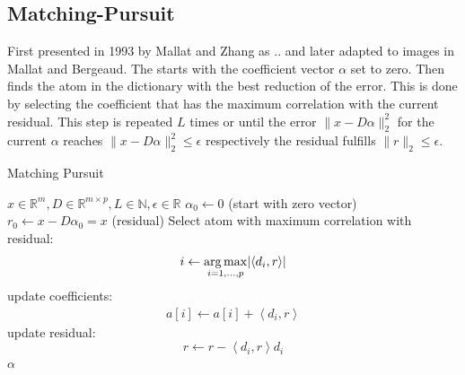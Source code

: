 \subsection{Matching-Pursuit}
\label{sec:mp}
First presented in 1993 by Mallat and Zhang\cite{Mallat1993} as .. and later
adapted to images in Mallat and Bergeaud\cite{Mallat1995}.
The  starts with the coefficient vector $\alpha$ set to
zero. Then finds the atom in the dictionary with the best reduction of the
error. This is done by selecting the coefficient that has the maximum
correlation with the current residual. This step is repeated $L$ times
or until the error $\lVert x - D\alpha \rVert^{2}_{2}$ for the current $\alpha$
reaches $\lVert x - D\alpha \rVert^{2}_{2} \leq \epsilon$ respectively the
residual fulfills $\lVert r \rVert_2 \leq \epsilon$.
\begin{algorithm}[H]
\caption{Matching Pursuit}
\label{alg:mp}
\begin{algorithmic}[1]
\REQUIRE $x \in \mathbb{R}^m, D \in \mathbb{R}^{m\times p}, L \in \mathbb{N},
\epsilon \in \mathbb{R}$
\STATE $\alpha_0 \gets 0$ (start with zero vector)
\STATE $r_0 \gets x-D\alpha_0 = x$ (residual) 
\STATE Select atom with maximum correlation with residual: 
\begin{equation*}
i \gets \operatorname*{arg\,max}_{i=1,...,p} \lvert \left<d_i,r\right> \rvert
\end{equation*}
\STATE update coefficients: 
\begin{align}
a[i]  \gets a[i] + \left<d_i,r\right> \label{eq:mp_update}
\end{align}
\STATE update residual:
\begin{equation*}
 r \gets r - \left<d_i,r\right>d_i
\end{equation*}
\ENDWHILE
\RETURN $\alpha$
\end{algorithmic}
\end{algorithm}

